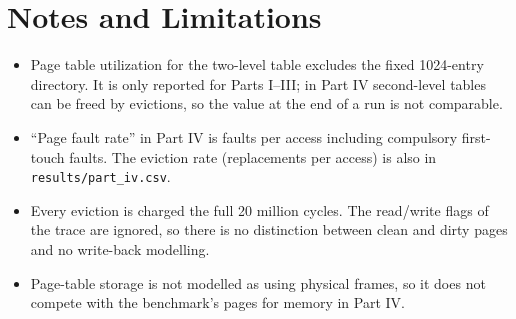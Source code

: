 \documentclass[11pt,a4paper]{article}
\begin{document}
\section{Notes and Limitations}
\begin{itemize}
\item Page table utilization for the two-level table excludes the fixed 1024-entry directory. It is only reported for Parts I--III; in Part IV second-level tables can be freed by evictions, so the value at the end of a run is not comparable.
\item ``Page fault rate'' in Part IV is faults per access including compulsory first-touch faults. The eviction rate (replacements per access) is also in \texttt{results/part\_iv.csv}.
\item Every eviction is charged the full 20 million cycles. The read/write flags of the trace are ignored, so there is no distinction between clean and dirty pages and no write-back modelling.
\item Page-table storage is not modelled as using physical frames, so it does not compete with the benchmark's pages for memory in Part IV.
\end{itemize}
\end{document}

